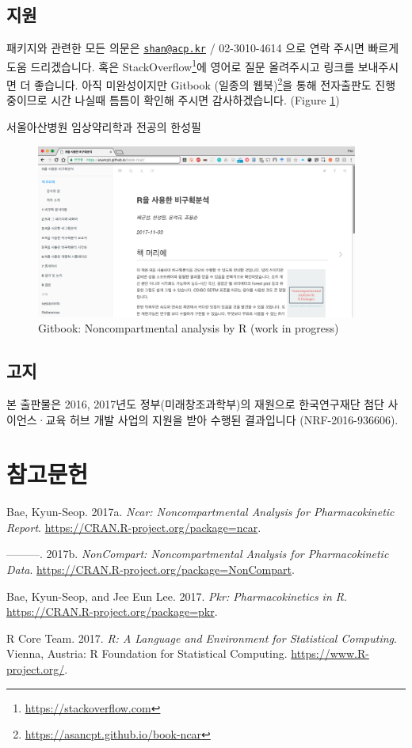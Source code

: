 \documentclass[12pt,]{krantz}
\let\rmarkdownfootnote\footnote%
\def\footnote{\protect\rmarkdownfootnote}
\begin{document}
\section{지원}

패키지와 관련한 모든 의문은
\href{mailto:shan@acp.kr}{\nolinkurl{shan@acp.kr}} / 02-3010-4614 으로
연락 주시면 빠르게 도움 드리겠습니다. 혹은 StackOverflow\footnote{\url{https://stackoverflow.com}}에
영어로 질문 올려주시고 링크를 보내주시면 더 좋습니다. 아직 미완성이지만
Gitbook (일종의 웹북)\footnote{\url{https://asancpt.github.io/book-ncar}}을
통해 전자출판도 진행 중이므로 시간 나실때 틈틈이 확인해 주시면
감사하겠습니다. (Figure \ref{fig:gitbook})

서울아산병원 임상약리학과 전공의 한성필

\begin{figure}
\includegraphics[width=400px]{assets/gitbook} \caption{Gitbook: Noncompartmental analysis by R (work in progress)}\label{fig:gitbook}
\end{figure}

\section{고지}

본 출판물은 2016, 2017년도 정부(미래창조과학부)의 재원으로 한국연구재단
첨단 사이언스·교육 허브 개발 사업의 지원을 받아 수행된 결과입니다
(NRF-2016-936606).

\hypertarget{references}{%
\chapter{참고문헌}\label{references}}

\hypertarget{refs}{}
\leavevmode\hypertarget{ref-R-ncar}{}%
Bae, Kyun-Seop. 2017a. \emph{Ncar: Noncompartmental Analysis for
Pharmacokinetic Report}. \url{https://CRAN.R-project.org/package=ncar}.

\leavevmode\hypertarget{ref-R-NonCompart}{}%
---------. 2017b. \emph{NonCompart: Noncompartmental Analysis for
Pharmacokinetic Data}.
\url{https://CRAN.R-project.org/package=NonCompart}.

\leavevmode\hypertarget{ref-R-pkr}{}%
Bae, Kyun-Seop, and Jee Eun Lee. 2017. \emph{Pkr: Pharmacokinetics in
R}. \url{https://CRAN.R-project.org/package=pkr}.

\leavevmode\hypertarget{ref-R-base}{}%
R Core Team. 2017. \emph{R: A Language and Environment for Statistical
Computing}. Vienna, Austria: R Foundation for Statistical Computing.
\url{https://www.R-project.org/}.
\end{document}

